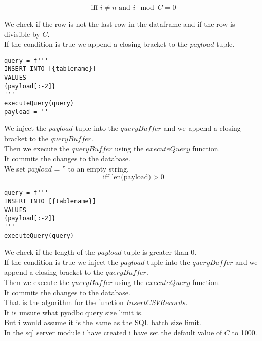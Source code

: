 \begin{equation}
\text{iff } i \neq n \text{ and } i \mod C = 0
\end{equation}

We check if the row is not the last row in the dataframe and if the row is divisible by $C$. \\
If the condition is true we append a closing bracket to the $payload$ tuple. \\

\begin{verbatim}
query = f'''
INSERT INTO [{tablename}]
VALUES
{payload[:-2]}
'''    
executeQuery(query)
payload = ''
\end{verbatim}

We inject the $payload$ tuple into the $queryBuffer$ and we append a closing bracket to the $queryBuffer$. \\
Then we execute the $queryBuffer$ using the $executeQuery$ function. \\
It commits the changes to the database. \\
We set $payload$ = '' to an empty string. \\

\begin{equation}
\text{iff len(payload)} > 0
\end{equation}

\begin{verbatim}
query = f'''
INSERT INTO [{tablename}]
VALUES
{payload[:-2]}
'''    
executeQuery(query)
\end{verbatim}

We check if the length of the $payload$ tuple is greater than 0. \\
If the condition is true we inject the $payload$ tuple into the $queryBuffer$ and we append a closing bracket to the $queryBuffer$. \\
Then we execute the $queryBuffer$ using the $executeQuery$ function. \\
It commits the changes to the database. \\

That is the algorithm for the function $InsertCSVRecords$. \\

It is unsure what pyodbc query size limit is. \\
But i would assume it is the same as the SQL batch size limit. \\
In the sql server module i have created i have set the default value of $C$ to 1000. \\

